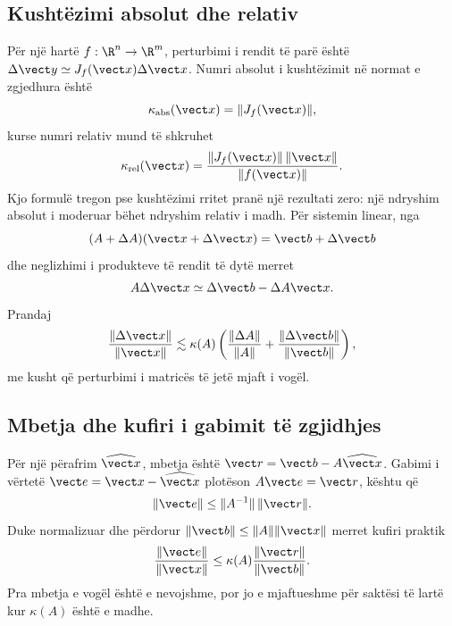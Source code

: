 \subsection{Kushtëzimi absolut dhe relativ}
Për një hartë $f:\R^n\to\R^m$, perturbimi i rendit të parë është $\Delta\vect y\simeq J_f(\vect x)\Delta\vect x$. Numri absolut i kushtëzimit në normat e zgjedhura është
\begin{equation}
 \kappa_{\mathrm{abs}}(\vect x)=\|J_f(\vect x)\|,
\end{equation}
kurse numri relativ mund të shkruhet
\begin{equation}
 \kappa_{\mathrm{rel}}(\vect x)=
 \frac{\|J_f(\vect x)\|\,\|\vect x\|}{\|f(\vect x)\|}.
\end{equation}
Kjo formulë tregon pse kushtëzimi rritet pranë një rezultati zero: një ndryshim absolut i moderuar bëhet ndryshim relativ i madh. Për sistemin linear, nga
\begin{equation}
 (A+\Delta A)(\vect x+\Delta\vect x)=\vect b+\Delta\vect b
\end{equation}
dhe neglizhimi i produkteve të rendit të dytë merret
\begin{equation}
 A\Delta\vect x\simeq\Delta\vect b-\Delta A\vect x.
\end{equation}
Prandaj
\begin{equation}
 \frac{\|\Delta\vect x\|}{\|\vect x\|}
 \lesssim\kappa(A)\left(
 \frac{\|\Delta A\|}{\|A\|}+\frac{\|\Delta\vect b\|}{\|\vect b\|}
 \right),
\end{equation}
me kusht që perturbimi i matricës të jetë mjaft i vogël.

\subsection{Mbetja dhe kufiri i gabimit të zgjidhjes}
Për një përafrim $\widehat{\vect x}$, mbetja është $\vect r=\vect b-A\widehat{\vect x}$. Gabimi i vërtetë $\vect e=\vect x-\widehat{\vect x}$ plotëson $A\vect e=\vect r$, kështu që
\begin{equation}
 \|\vect e\|\le\|A^{-1}\|\,\|\vect r\|.
\end{equation}
Duke normalizuar dhe përdorur $\|\vect b\|\le\|A\|\|\vect x\|$ merret kufiri praktik
\begin{equation}
 \frac{\|\vect e\|}{\|\vect x\|}
 \le \kappa(A)\frac{\|\vect r\|}{\|\vect b\|}.
\end{equation}
Pra mbetja e vogël është e nevojshme, por jo e mjaftueshme për saktësi të lartë kur $\kappa(A)$ është e madhe.

